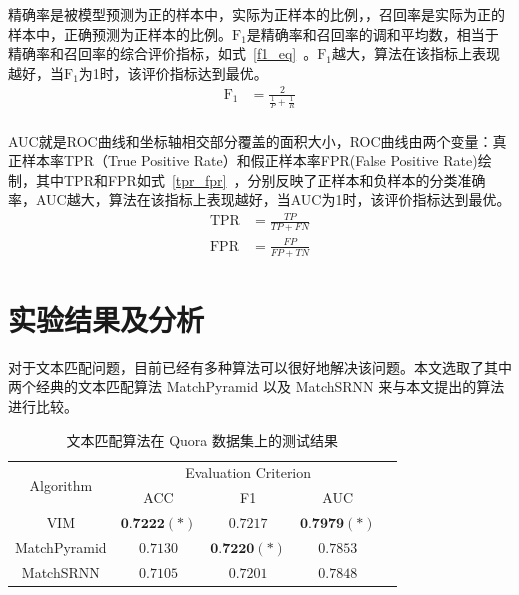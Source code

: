 精确率是被模型预测为正的样本中，实际为正样本的比例，，召回率是实际为正的样本中，正确预测为正样本的比例。$\text{F}_1$是精确率和召回率的调和平均数，相当于精确率和召回率的综合评价指标，如式~\eqref{f1_eq}~。$\text{F}_1$越大，算法在该指标上表现越好，当$\text{F}_1$为1时，该评价指标达到最优。
\begin{equation}
\label{f1_eq}
\begin{aligned}
\text{F}_1 &= \frac{2}{\frac{1}{P}+\frac{1}{R}} \\
\end{aligned}
\end{equation}

AUC就是ROC曲线和坐标轴相交部分覆盖的面积大小，ROC曲线由两个变量：真正样本率TPR（True Positive Rate）和假正样本率FPR(False Positive Rate)绘制，其中TPR和FPR如式~\eqref{tpr_fpr}~，分别反映了正样本和负样本的分类准确率，AUC越大，算法在该指标上表现越好，当AUC为1时，该评价指标达到最优。
\begin{equation}
\label{tpr_fpr}
\begin{aligned}
\text{TPR} &= \frac{TP}{TP+FN} \\
\text{FPR} &= \frac{FP}{FP+TN}
\end{aligned}
\end{equation}


\section{实验结果及分析}
\label{sec:lab_value}
对于文本匹配问题，目前已经有多种算法可以很好地解决该问题。本文选取了其中两个经典的文本匹配算法 MatchPyramid\cite{Pang2016TextMA} 以及 MatchSRNN\cite{Wan2016MatchSRNNMT} 来与本文提出的算法进行比较。

\begin{table}[htbp]
\caption{文本匹配算法在 Quora 数据集上的测试结果}\label{tab:MDP_test}
\vspace{0.5em}\centering\wuhao
\begin{tabular}{ccccc}
\toprule[1.5pt]
	\multirow{2}{*}{Algorithm} &
	\multicolumn{3}{c}{\multirow{1}{*}{Evaluation Criterion}} \\
	\cline{2-4} & ACC & F1 & AUC \\
	\midrule[1pt]
	VIM & $\textbf{0.7222}(*)$ & $0.7217$ & $\textbf{0.7979}(*)$ \\
    MatchPyramid & $0.7130$ & $\textbf{0.7220}(*)$ & $0.7853$ \\
    MatchSRNN & $0.7105$ & $0.7201$ & $0.7848$\\
\bottomrule[1.5pt]
\end{tabular}
\vspace{\baselineskip}
\end{table}

